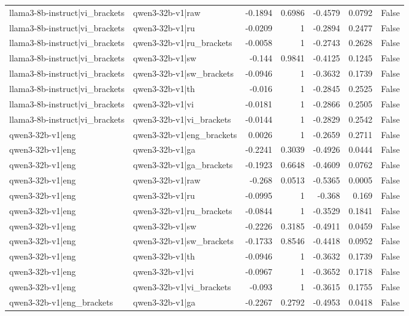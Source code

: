 \begin{table}
\begin{tabular}{l l r r r r l}
llama3-8b-instruct|vi_brackets & qwen3-32b-v1|raw & -0.1894 & 0.6986 & -0.4579 & 0.0792 & False \\
llama3-8b-instruct|vi_brackets & qwen3-32b-v1|ru & -0.0209 & 1 & -0.2894 & 0.2477 & False \\
llama3-8b-instruct|vi_brackets & qwen3-32b-v1|ru_brackets & -0.0058 & 1 & -0.2743 & 0.2628 & False \\
llama3-8b-instruct|vi_brackets & qwen3-32b-v1|sw & -0.144 & 0.9841 & -0.4125 & 0.1245 & False \\
llama3-8b-instruct|vi_brackets & qwen3-32b-v1|sw_brackets & -0.0946 & 1 & -0.3632 & 0.1739 & False \\
llama3-8b-instruct|vi_brackets & qwen3-32b-v1|th & -0.016 & 1 & -0.2845 & 0.2525 & False \\
llama3-8b-instruct|vi_brackets & qwen3-32b-v1|vi & -0.0181 & 1 & -0.2866 & 0.2505 & False \\
llama3-8b-instruct|vi_brackets & qwen3-32b-v1|vi_brackets & -0.0144 & 1 & -0.2829 & 0.2542 & False \\
qwen3-32b-v1|eng & qwen3-32b-v1|eng_brackets & 0.0026 & 1 & -0.2659 & 0.2711 & False \\
qwen3-32b-v1|eng & qwen3-32b-v1|ga & -0.2241 & 0.3039 & -0.4926 & 0.0444 & False \\
qwen3-32b-v1|eng & qwen3-32b-v1|ga_brackets & -0.1923 & 0.6648 & -0.4609 & 0.0762 & False \\
qwen3-32b-v1|eng & qwen3-32b-v1|raw & -0.268 & 0.0513 & -0.5365 & 0.0005 & False \\
qwen3-32b-v1|eng & qwen3-32b-v1|ru & -0.0995 & 1 & -0.368 & 0.169 & False \\
qwen3-32b-v1|eng & qwen3-32b-v1|ru_brackets & -0.0844 & 1 & -0.3529 & 0.1841 & False \\
qwen3-32b-v1|eng & qwen3-32b-v1|sw & -0.2226 & 0.3185 & -0.4911 & 0.0459 & False \\
qwen3-32b-v1|eng & qwen3-32b-v1|sw_brackets & -0.1733 & 0.8546 & -0.4418 & 0.0952 & False \\
qwen3-32b-v1|eng & qwen3-32b-v1|th & -0.0946 & 1 & -0.3632 & 0.1739 & False \\
qwen3-32b-v1|eng & qwen3-32b-v1|vi & -0.0967 & 1 & -0.3652 & 0.1718 & False \\
qwen3-32b-v1|eng & qwen3-32b-v1|vi_brackets & -0.093 & 1 & -0.3615 & 0.1755 & False \\
qwen3-32b-v1|eng_brackets & qwen3-32b-v1|ga & -0.2267 & 0.2792 & -0.4953 & 0.0418 & False \\

\end{tabular}
\end{table}
